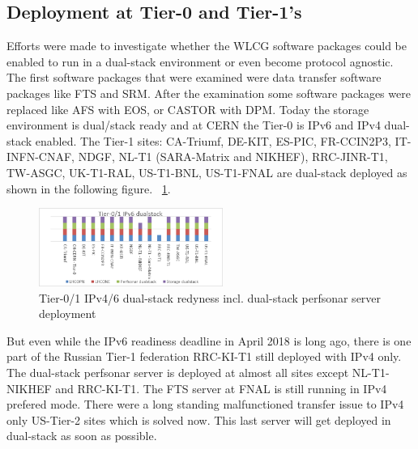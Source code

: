 
%

\subsection{Deployment at Tier-0 and Tier-1's}
Efforts were made to investigate whether the WLCG software packages could be enabled to run in a dual-stack environment or even become protocol agnostic. The first software packages that were examined were data transfer software packages like FTS and SRM. After the examination some software packages were replaced like AFS with EOS, or CASTOR with DPM. Today the storage environment is dual/stack ready and at CERN the Tier-0 is IPv6 and IPv4 dual-stack enabled. The Tier-1 sites: CA-Triumf, DE-KIT, ES-PIC, FR-CCIN2P3, IT-INFN-CNAF, NDGF, NL-T1 (SARA-Matrix and NIKHEF), RRC-JINR-T1, TW-ASGC, UK-T1-RAL, US-T1-BNL, US-T1-FNAL are dual-stack deployed as shown in the following figure. ~\ref{fig:t1ds}.
\begin{figure}[h]
\centering
\includegraphics[width=6cm]{hepix-ipv6-tier01-dual-stack}
\caption{Tier-0/1 IPv4/6 dual-stack redyness incl. dual-stack perfsonar server deployment}
\label{fig:t1ds}
\end{figure}
But even while the IPv6 readiness deadline in April 2018 is long ago, there is one part of the Russian Tier-1 federation RRC-KI-T1 still deployed with IPv4 only. The dual-stack perfsonar server is deployed at almost all sites except NL-T1-NIKHEF and RRC-KI-T1. The FTS server at FNAL is still running in IPv4 prefered mode. There were a long standing malfunctioned transfer issue to IPv4 only US-Tier-2 sites which is solved now. This last server will get deployed in dual-stack as soon as possible.
